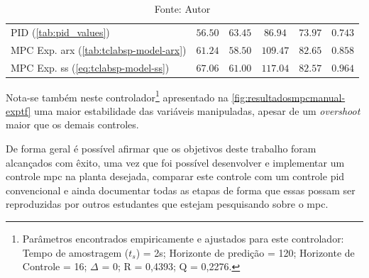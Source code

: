\begin{table}[!h]
\begin{tabular}{l|cccc|c}
		PID (\cref{tab:pid_values})	                                        &   $56.50$           												&   $63.45$          											&   $86.94$          														&   $73.97$														&   $0.743$             														\\ 
		MPC Exp. \acrshort{arx}	(\cref{tab:tclabsp-model-arx})				&   $61.24$           												&   $58.50$          											&   $109.47$         														&   $82.65$														&   $0.858$             														\\ 
		MPC Exp. \acrshort{ss} (\cref{eq:tclabsp-model-ss})					&   $67.06$           												&   $61.00$          											&   $117.04$         														&   $82.57$														&   $0.964$             														\\ \bottomrule 
	\end{tabular}
	\caption*{Fonte: Autor}
\end{table}

Nota-se também neste controlador\footnote{
    Parâmetros encontrados empiricamente e ajustados para este controlador: Tempo de amostragem ($t_s$) = 2s; Horizonte de predição = 120;
    Horizonte de Controle = 16; $\Delta$ = 0; R = 0,4393; Q = 0,2276.
} apresentado na \cref{fig:resultadosmpcmanual-exptf} uma maior estabilidade
das variáveis manipuladas, apesar de um \textit{overshoot} maior que os demais controles.

De forma geral é possível afirmar que os objetivos deste trabalho foram alcançados com êxito, uma vez que foi
possível desenvolver e implementar um controle \acrshort{mpc} na planta desejada, comparar este controle 
com um controle \acrshort{pid} convencional e ainda documentar todas as etapas de forma que essas possam ser reproduzidas
por outros estudantes que estejam pesquisando sobre o \acrlong{mpc}.


